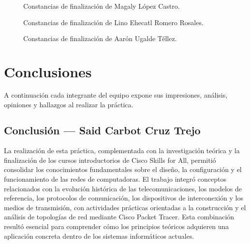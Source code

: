 \begin{figure}[H]
    \centering
    \hfill
    \caption{Constancias de finalización de Magaly López Castro.}
    \label{fig:prac04:cert:magaly}
\end{figure}

\begin{figure}[H]
    \centering
    \hfill
    \caption{Constancias de finalización de Lino Ehecatl Romero Rosales.}
    \label{fig:prac04:cert:lino}
\end{figure}

\begin{figure}[H]
    \centering
    \hfill
    \caption{Constancias de finalización de Aarón Ugalde Téllez.}
    \label{fig:prac04:cert:aaron}
\end{figure}

\section{Conclusiones}
\label{sec:prac04:conclusiones}

A continuación cada integrante del equipo expone sus impresiones, análisis, opiniones y hallazgos al realizar la práctica.

\clearpage
\subsection{Conclusión — Said Carbot Cruz Trejo}
\label{sec:prac04:concl:said}

La realización de esta práctica, complementada con la investigación teórica y la finalización de los cursos introductorios de Cisco Skills for All, permitió consolidar los conocimientos fundamentales sobre el diseño, la configuración y el funcionamiento de las redes de computadoras. El trabajo integró conceptos relacionados con la evolución histórica de las telecomunicaciones, los modelos de referencia, los protocolos de comunicación, los dispositivos de interconexión y los medios de transmisión, con actividades prácticas orientadas a la construcción y el análisis de topologías de red mediante Cisco Packet Tracer. Esta combinación resultó esencial para comprender cómo los principios teóricos adquieren una aplicación concreta dentro de los sistemas informáticos actuales.

